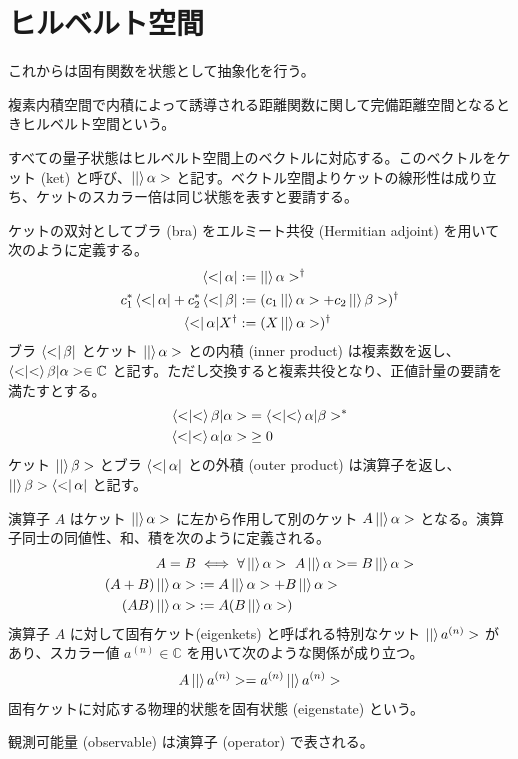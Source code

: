 \documentclass[uplatex,dvipdfmx,a4paper,11pt]{jlreq}
\newcommand{\CC}{\mathbb{C}}
\numberwithin{equation}{section}
\theoremstyle{definition}
\begin{document}
\section{ヒルベルト空間}
これからは固有関数を状態として抽象化を行う。
\begin{definition}
  複素内積空間で内積によって誘導される距離関数に関して完備距離空間となるときヒルベルト空間という。
\end{definition}
\begin{definition}[ブラケット]
  すべての量子状態はヒルベルト空間上のベクトルに対応する。このベクトルをケット (ket) と呼び、$\ket|\alpha>$ と記す。ベクトル空間よりケットの線形性は成り立ち、ケットのスカラー倍は同じ状態を表すと要請する。

  ケットの双対としてブラ (bra) をエルミート共役 (Hermitian adjoint) を用いて次のように定義する。
  \begin{align}
    \bra<\alpha|                         & := \ket|\alpha>^\dagger                       \\
    c_1^*\bra<\alpha| + c_2^*\bra<\beta| & := (c_1\ket|\alpha> + c_2\ket|\beta>)^\dagger \\
    \bra<\alpha|X^\dagger                & := (X\ket|\alpha>)^\dagger
  \end{align}
  ブラ $\bra<\beta|$ とケット $\ket|\alpha>$ との内積 (inner product) は複素数を返し、$\braket<\beta|\alpha>\in\CC$ と記す。ただし交換すると複素共役となり、正値計量の要請を満たすとする。
  \begin{align}
    \braket<\beta|\alpha>  & = \braket<\alpha|\beta>^* \\
    \braket<\alpha|\alpha> & \geq 0
  \end{align}
  ケット $\ket|\beta>$ とブラ $\bra<\alpha|$ との外積 (outer product) は演算子を返し、$\ket|\beta>\bra<\alpha|$ と記す。
\end{definition}
\begin{definition}[演算子]
  演算子 $A$ はケット $\ket|\alpha>$ に左から作用して別のケット $A\ket|\alpha>$ となる。演算子同士の同値性、和、積を次のように定義される。
  \begin{align}
    A = B               & \iff \forall \ket|\alpha>\ A\ket|\alpha> = B\ket|\alpha> \\
    (A + B)\ket|\alpha> & := A\ket|\alpha> + B\ket|\alpha>                         \\
    (AB)\ket|\alpha>    & := A(B\ket|\alpha>)
  \end{align}
  演算子 $A$ に対して固有ケット(eigenkets) と呼ばれる特別なケット $\ket|a^{(n)}>$ があり、スカラー値 $a^{(n)}\in\CC$ を用いて次のような関係が成り立つ。
  \begin{align}
    A\ket|a^{(n)}> = a^{(n)}\ket|a^{(n)}>
  \end{align}
  固有ケットに対応する物理的状態を固有状態 (eigenstate) という。
\end{definition}
観測可能量 (observable) は演算子 (operator) で表される。
\end{document}
